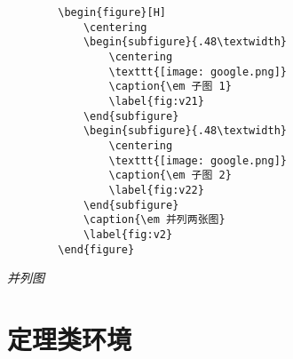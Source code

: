 \documentclass[a4paper, 12pt, UTF8]{ctexart}
\begin{document}
\begin{listing}[ht]
    \begin{verbatim}
        \begin{figure}[H]
            \centering
            \begin{subfigure}{.48\textwidth}
                \centering
                \texttt{[image: google.png]}
                \caption{\em 子图 1}
                \label{fig:v21}
            \end{subfigure}
            \begin{subfigure}{.48\textwidth}
                \centering
                \texttt{[image: google.png]}
                \caption{\em 子图 2}
                \label{fig:v22}
            \end{subfigure}
            \caption{\em 并列两张图}
            \label{fig:v2}
        \end{figure}
    \end{verbatim}
    \caption{\em 并列图}
    \label{subfigure}
\end{listing}

\clearpage

\section{定理类环境}
\begin{defn}{}{}
    
\end{defn}

\begin{lem}{}{}
    
\end{lem}

\begin{thm}{}{}
    \begin{case}
        
    \end{case}
    \begin{case}
        
    \end{case}
\end{thm}

\begin{rem}
    
\end{rem}
\end{document}

